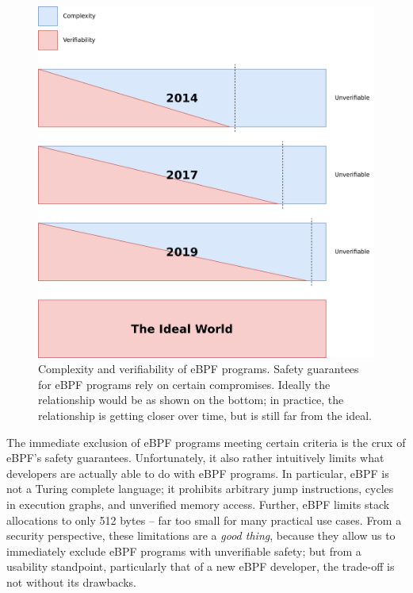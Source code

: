 \documentclass[
  12pt]{findlay}
\begin{document}
\begin{figure}[p]
    \caption[Complexity and verifiability of eBPF programs.]{
        Complexity and verifiability of eBPF programs.
        Safety guarantees for eBPF programs rely on certain compromises.
        Ideally the relationship would be as shown on the bottom;
        in practice, the relationship is getting closer over time, but is still
        far from the ideal.
    }
    \label{complexity-verifiability}
    \includegraphics[height=.4\textheight]{../figures/complexity-verifiability.png}
\end{figure}

The immediate exclusion of eBPF programs meeting certain criteria is the
crux of eBPF's safety guarantees. Unfortunately, it also rather
intuitively limits what developers are actually able to do with eBPF
programs. In particular, eBPF is not a Turing complete language; it
prohibits arbitrary jump instructions, cycles in execution graphs, and
unverified memory access. Further, eBPF limits stack allocations to only
512 bytes \autocite{gregg19bpf} -- far too small for many practical use
cases. From a security perspective, these limitations are a \emph{good
thing}, because they allow us to immediately exclude eBPF programs with
unverifiable safety; but from a usability standpoint, particularly that
of a new eBPF developer, the trade-off is not without its drawbacks.
\end{document}

